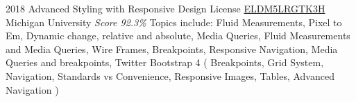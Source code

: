 \documentclass[11pt,a4paper]{moderncv}
\begin{document}
\cventry
    {2018}
    {Advanced Styling with Responsive Design}
    {License
        \href{https://www.coursera.org/account/accomplishments/records/ELDM5LRGTK3H}
        {ELDM5LRGTK3H}
    }
    {Michigan University}
    {\textit{Score 92.3\%}}
    {
        Topics include:                                                                                           %
            Fluid Measurements,                                                                                   %
            Pixel to Em,                                                                                          %
            Dynamic change,                                                                                       %
            relative and absolute,                                                                                %
            Media Queries,                                                                                        %
            Fluid Measurements and Media Queries,                                                                 %
            Wire Frames,                                                                                          %
            Breakpoints,                                                                                          %
            Responsive Navigation,                                                                                %
            Media Queries and breakpoints,                                                                        %
            Twitter Bootstrap 4 (                                                                                 %
                Breakpoints,                                                                                      %
                Grid System,                                                                                      %
                Navigation,                                                                                       %
                Standards vs Convenience,                                                                         %
                Responsive Images,                                                                                %
                Tables,                                                                                           %
                Advanced Navigation                                                                               %
                )                                                                                                 %
    }
\end{document}
